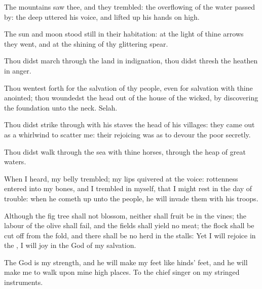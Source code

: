 \Verse The mountains saw thee, and they trembled: the overflowing of the water passed by: the deep uttered his voice, and lifted up his hands on high.

\Verse The sun and moon stood still in their habitation: at the light of thine arrows they went, and at the shining of thy glittering spear.

\Verse Thou didst march through the land in indignation, thou didst thresh the heathen in anger.

\Verse Thou wentest forth for the salvation of thy people, even for salvation with thine anointed; thou woundedst the head out of the house of the wicked, by discovering the foundation unto the neck.  Selah.

\Verse Thou didst strike through with his staves the head of his villages: they came out as a whirlwind to scatter me: their rejoicing was as to devour the poor secretly.

\Verse Thou didst walk through the sea with thine horses, through the heap of great waters.

\Verse When I heard, my belly trembled; my lips quivered at the voice: rottenness entered into my bones, and I trembled in myself, that I might rest in the day of trouble: when he cometh up unto the people, he will invade them with his troops.

\Verse Although the fig tree shall not blossom, neither shall fruit be in the vines; the labour of the olive shall fail, and the fields shall yield no meat; the flock shall be cut off from the fold, and there shall be no herd in the stalls: \Verse Yet I will rejoice in the \LORD, I will joy in the God of my salvation.

\Verse The \LORD God is my strength, and he will make my feet like hinds' feet, and he will make me to walk upon mine high places. To the chief singer on my stringed instruments.

